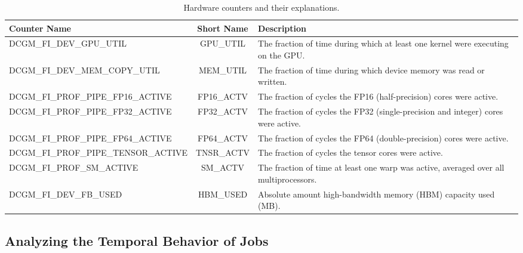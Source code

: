 \begin{table*}[t]
    \centering
    \caption{Hardware counters and their explanations.}
    \label{table:dataset_info}
    \begin{tabular}{lcp{9cm}} \toprule
        \textbf{Counter Name}                & \textbf{Short Name} & \textbf{Description}                                                                  \\  \midrule
        DCGM\_FI\_DEV\_GPU\_UTIL             & GPU\_UTIL           & The fraction of time during which at least one kernel were executing on the GPU.      \\
        DCGM\_FI\_DEV\_MEM\_COPY\_UTIL       & MEM\_UTIL           & The fraction of time during which device memory was read or written.                  \\
        DCGM\_FI\_PROF\_PIPE\_FP16\_ACTIVE   & FP16\_ACTV          & The fraction of cycles the FP16 (half-precision) cores were active.                   \\
        DCGM\_FI\_PROF\_PIPE\_FP32\_ACTIVE   & FP32\_ACTV          & The fraction of cycles the FP32 (single-precision and integer) cores were active.     \\
        DCGM\_FI\_PROF\_PIPE\_FP64\_ACTIVE   & FP64\_ACTV          & The fraction of cycles the FP64 (double-precision) cores were active.                 \\
        DCGM\_FI\_PROF\_PIPE\_TENSOR\_ACTIVE & TNSR\_ACTV          & The fraction of cycles the tensor cores were active.                                  \\
        DCGM\_FI\_PROF\_SM\_ACTIVE           & SM\_ACTV            & The fraction of time at least one warp was active, averaged over all multiprocessors. \\
        DCGM\_FI\_DEV\_FB\_USED              & HBM\_USED           & Absolute amount high-bandwidth memory (HBM) capacity used (MB).                       \\ \bottomrule
    \end{tabular}
\end{table*}

\subsection{Analyzing the Temporal Behavior of Jobs}

